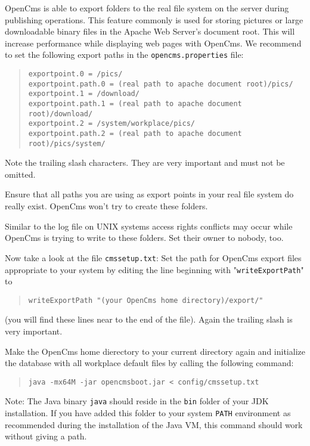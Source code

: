 OpenCms is able to export folders to the real file system on the server during 
publishing operations. This feature commonly is used for storing pictures or large downloadable
binary files in the Apache Web Server's
document root. This will increase performance while displaying web pages with OpenCms.
We recommend to set the following export paths in the \texttt{opencms.properties} file:

\begin{quote}
\begin{verbatim}
exportpoint.0 = /pics/
exportpoint.path.0 = (real path to apache document root)/pics/
exportpoint.1 = /download/
exportpoint.path.1 = (real path to apache document root)/download/
exportpoint.2 = /system/workplace/pics/
exportpoint.path.2 = (real path to apache document root)/pics/system/
\end{verbatim}
\end{quote}

Note the trailing slash
characters. They are very important and must not be omitted.

Ensure that all paths you are using as export points in your real file system
do really exist. OpenCms won't try to create these folders.

Similar to the log file on UNIX systems access rights conflicts may occur while
OpenCms is trying to write to these folders. Set their owner to nobody, too.

Now take a look at the file \texttt{cmssetup.txt}:
Set the path for OpenCms export files appropriate to your system by editing
the line beginning with "\texttt{writeExportPath}" to 

\begin{quote}
\texttt{writeExportPath "(your OpenCms home directory)/export/"}
\end{quote}

(you will find these lines near to the end of the file).
Again the trailing slash is very important. 

Make the OpenCms home dierectory to your current directory again and
initialize the database with all workplace default files by calling the following command:

\begin{quote}
\texttt{java -mx64M -jar opencmsboot.jar < config/cmssetup.txt}
\end{quote}

Note: The Java binary \texttt{java} should 
reside in the \texttt{bin} folder of your JDK installation. If you have added this folder to your 
system \texttt{PATH} environment as recommended during the installation of the Java VM,
this command should work without giving a path.

